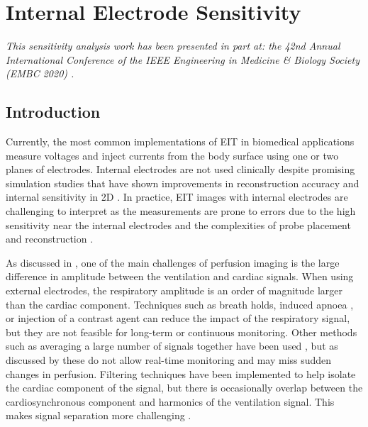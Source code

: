 \chapter{Internal Electrode Sensitivity}
\label{chap:chapter-6}
\emph{This sensitivity analysis work has
 been presented in part at: the 42nd Annual International Conference of the IEEE Engineering 
 in Medicine \& Biology Society (EMBC 2020) \parencite{stowe_effect_2020}.} 

\section{Introduction}
Currently, the most common implementations of EIT in biomedical applications
measure voltages and inject currents from the body surface using 
one or two planes of electrodes. Internal electrodes are not used clinically
despite promising simulation studies that have shown improvements 
in reconstruction accuracy and internal sensitivity in 
2D \parencite{nasehi_tehrani_evaluation_2012,nasehi_tehrani_modelling_2012}. 
In practice, EIT images with internal electrodes are challenging 
to interpret 
as the measurements are prone to errors 
due to the high sensitivity near the internal electrodes and the complexities of probe 
placement and reconstruction \parencite{czaplik_application_2014}. 

As discussed in , one of the main challenges 
of perfusion imaging is the large difference in amplitude 
between the ventilation and cardiac signals. 
When using external electrodes, the respiratory amplitude is 
an order of magnitude larger than the cardiac component. 
Techniques such as 
breath holds, induced apnoea \parencite{leathard_comparison_1994,stowe_comparison_2019}, 
or injection 
of a contrast agent \parencite{frerichs_regional_2002} can reduce the
impact of the respiratory signal, but they are not feasible for 
long-term or continuous monitoring. 
Other methods such as averaging a large number of signals together 
have been used \parencite{eyuboglu_vivo_1989,vonk_noordegraaf_pulmonary_1998}, 
but as discussed by  
these do not allow real-time monitoring and 
may miss sudden changes in perfusion.
Filtering techniques have been implemented to help isolate the 
cardiac component of the signal, but there is occasionally overlap between 
the cardiosynchronous component and harmonics of the ventilation
signal. This makes signal separation more 
challenging \parencite{zadehkoochak_pulmonary_1992,leathard_comparison_1994}.

